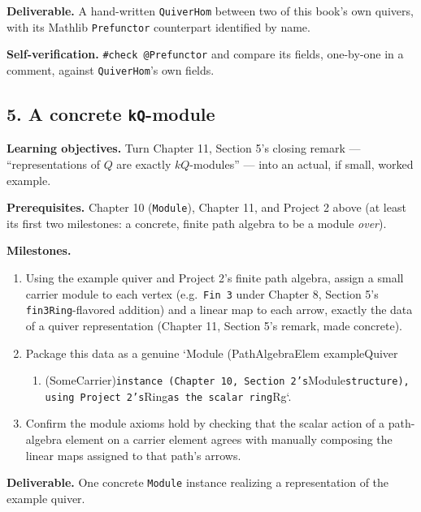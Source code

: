 \textbf{Deliverable.} A hand-written \texttt{QuiverHom} between two of this book's own quivers, with its Mathlib \texttt{Prefunctor} counterpart identified by name.

\textbf{Self-verification.} \texttt{\#check @Prefunctor} and compare its fields, one-by-one in a comment, against \texttt{QuiverHom}'s own fields.

\subsection{\texorpdfstring{5. A concrete \texttt{kQ}-module}{5. A concrete kQ-module}}\label{sec:13-next-steps:03-next-projects:6}

\textbf{Learning objectives.} Turn Chapter 11, Section 5's closing remark --- ``representations of \(Q\) are exactly \(kQ\)-modules'' --- into an actual, if small, worked example.

\textbf{Prerequisites.} Chapter 10 (\texttt{Module}), Chapter 11, and Project 2 above (at least its first two milestones: a concrete, finite path algebra to be a module \emph{over}).

\textbf{Milestones.}

\begin{enumerate}
\def\labelenumi{\arabic{enumi}.}
\tightlist
\item
  Using the example quiver and Project 2's finite path algebra, assign a small carrier module to each vertex (e.g.~\texttt{Fin 3} under Chapter 8, Section 5's \texttt{fin3Ring}-flavored addition) and a linear map to each arrow, exactly the data of a quiver representation (Chapter 11, Section 5's remark, made concrete).
\item
  Package this data as a genuine `Module (PathAlgebraElem exampleQuiver

  \begin{enumerate}
  \def\labelenumii{\alph{enumii})}
  \setcounter{enumii}{10}
  \tightlist
  \item
    (SomeCarrier)\texttt{instance (Chapter 10, Section 2's}Module\texttt{structure), using Project 2's}Ring\texttt{as the scalar ring}Rg`.
  \end{enumerate}
\item
  Confirm the module axioms hold by checking that the scalar action of a path-algebra element on a carrier element agrees with manually composing the linear maps assigned to that path's arrows.
\end{enumerate}

\textbf{Deliverable.} One concrete \texttt{Module} instance realizing a representation of the example quiver.

